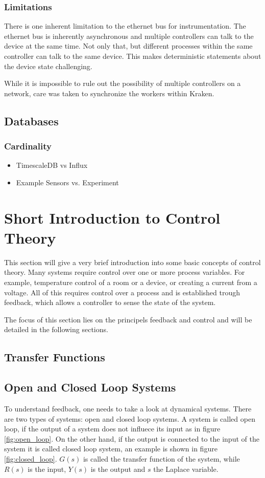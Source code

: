 \subsubsection{Limitations} %
There is one inherent limitation to the ethernet bus for instrumentation. The ethernet bus is inherently asynchronous and multiple controllers can talk to the device at the same time. Not only that, but different processes within the same controller can talk to the same device. This makes deterministic statements about the device state challenging.

While it is impossible to rule out the possibility of multiple controllers on a network, care was taken to synchronize the workers within Kraken.
\subsection{Databases}
\subsubsection{Cardinality}
\begin{itemize}
 \item TimescaleDB vs Influx
 \item Example Sensors vs. Experiment
\end{itemize}

\clearpage
\section{Short Introduction to Control Theory}
This section will give a very brief introduction into some basic concepts of control theory. Many systems require control over one or more process variables. For example, temperature control of a room or a device, or creating a current from a voltage. All of this requires control over a process and is established trough feedback, which allows a controller to sense the state of the system.

The focus of this section lies on the principels feedback and control and will be detailed in the following sections.

\subsection{Transfer Functions}

\subsection{Open and Closed Loop Systems}
To understand feedback, one needs to take a look at dynamical systems. There are two types of systems: open and closed loop systems. A system is called open loop, if the output of a system does not influece its input as in figure \ref{fig:open_loop}. On the other hand, if the output is connected to the input of the system it is called closed loop system, an example is shown in figure \ref{fig:closed_loop}. $G(s)$ is called the transfer function of the system, while $R(s)$ is the input, $Y(s)$ is the output and $s$ the Laplace variable.

